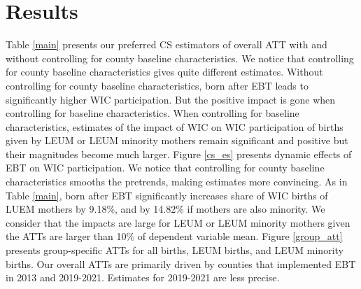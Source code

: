 \section{Results}
Table \ref{main} presents our preferred CS estimators of overall ATT with and without controlling for county baseline characteristics. We notice that controlling for county baseline characteristics gives quite different estimates. Without controlling for county baseline characteristics, born after EBT leads to significantly higher WIC participation. But the positive impact is gone when controlling for baseline characteristics. When controlling for baseline characteristics, estimates of the impact of WIC on WIC participation of births given by LEUM or LEUM minority mothers remain significant and positive but their magnitudes become much larger. Figure \ref{cs_es} presents dynamic effects of EBT on WIC participation. We notice that controlling for county baseline characteristics smooths the pretrends, making estimates more convincing. As in Table \ref{main}, born after EBT significantly increases share of WIC births of LUEM mothers by 9.18\%, and by 14.82\% if mothers are also minority. We consider that the impacts are large for LEUM or LEUM minority mothers given the ATTs are larger than 10\% of dependent variable mean. Figure \ref{group_att} presents group-specific ATTs for all births, LEUM births, and LEUM minority births. Our overall ATTs are primarily driven by counties that implemented EBT in 2013 and 2019-2021. Estimates for 2019-2021 are less precise.


